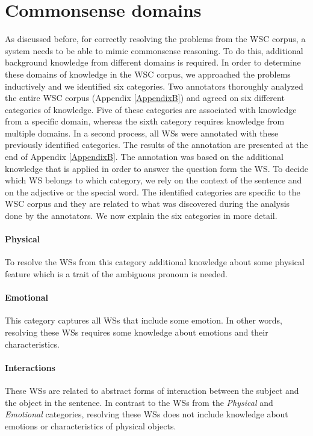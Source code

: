 \section{Commonsense domains}
As discussed before, for correctly resolving the problems from the WSC corpus, a system needs to be able to mimic commonsense reasoning. To do this, additional background knowledge from different domains is required. In order to determine these domains of knowledge in the WSC corpus, we approached the problems inductively and we identified six categories. Two annotators thoroughly analyzed the entire WSC corpus (Appendix \ref{AppendixB}) and agreed on six different categories of knowledge. Five of these categories are associated with knowledge from a specific domain, whereas the sixth category requires knowledge from multiple domains.
In a second process, all WSs were annotated with these previously identified categories. The results of the annotation are presented at the end of Appendix \ref{AppendixB}. The annotation was based on the additional knowledge that is applied in order to answer the question form the WS. To decide which WS belongs to which category, we rely on the context of the sentence and on the adjective or the special word. The identified categories are specific to the WSC corpus and they are related to what was discovered during the analysis done by the annotators. We now explain the six categories in more detail. 

\paragraph{Physical} To resolve the WSs from this category additional knowledge about some physical feature which is a trait of the ambiguous pronoun is needed.
 
\paragraph{Emotional} This category captures all WSs that include some emotion. In other words, resolving these WSs requires some knowledge about emotions and their characteristics.

\paragraph{Interactions} These WSs are related to abstract forms of interaction between the subject and the object in the sentence. In contrast to the WSs from the \textit{Physical} and \textit{Emotional} categories, resolving these WSs does not include knowledge about emotions or characteristics of physical objects.

